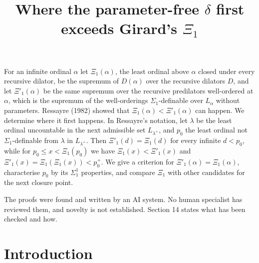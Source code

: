 \documentclass[11pt]{article}
\title{Where the parameter-free $\delta$ first exceeds Girard's $\Xi_1$}
\date{\paperversion}
\begin{document}
\maketitle
\newcommand{\Xo}{\Xi_1}
\newcommand{\Xp}{\Xi'_1}
\newcommand{\PR}{\mathrm{PAD}_{\mathcal R}}
\newcommand{\PRp}{\mathrm{PAD}'_{\mathcal R}}
\newcommand{\dz}[1]{\delta^0_{#1}}
\newcommand{\nx}{\operatorname{nx}}
\newcommand{\Pre}{\mathrm{Pre}}
\newcommand{\Dil}{\mathrm{Dil}}
\newcommand{\tl}{\triangleleft}
\newcommand{\E}{\mathrel{E}}

\begin{frontnote} For an infinite ordinal $\alpha$ let $\Xo(\alpha)$, the least ordinal above
$\alpha$ closed under every recursive dilator, be the supremum of $D(\alpha)$ over the recursive dilators $D$, and
let $\Xp(\alpha)$ be the same supremum over the recursive predilators well-ordered at $\alpha$, which is the
supremum of the well-orderings $\Sigma_1$-definable over $L_{\alpha}$ without parameters. Ressayre (1982) showed
that $\Xo(\alpha) < \Xp(\alpha)$ can happen. We determine where it first happens. In Ressayre's notation, let
$\lambda$ be the least ordinal uncountable in the next admissible set $L_{\lambda^+}$, and $p_0$ the least ordinal
not $\Sigma_1$-definable from $\lambda$ in $L_{\lambda^+}$. Then $\Xp(d) = \Xo(d)$ for every infinite
$d < p_0$, while for $p_0 \le x < \Xo(p_0)$ we have $\Xo(x) < \Xp(x)$ and
$\Xp(x) = \Xo(\Xo(x)) < p_0^+$. We give a criterion for $\Xp(\alpha) = \Xo(\alpha)$, characterise $p_0$ by
its $\Sigma^1_1$ properties, and compare $\Xo$ with other candidates for the next closure point.
\end{frontnote}

\begin{frontnote} The proofs were found and written by an AI system. No human specialist has
reviewed them, and novelty is not established. Section 14 states what has been checked and how.
\end{frontnote}

\section{Introduction}
\end{document}

